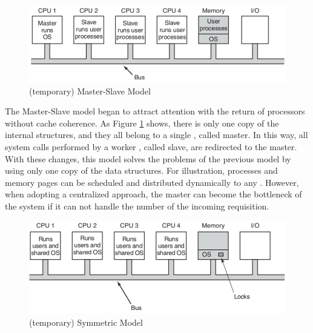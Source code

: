 			\begin{figure}[h]
				\centering
				\includegraphics[width=.8\textwidth]{images/master-slave-os.png}

				\caption{
					(temporary) Master-Slave \os Model
				}\par
				\label{fig::master_slave_os}
			\end{figure}

			The Master-Slave model began to attract attention with the return of
			processors without cache coherence.
			As Figure \ref{fig::master_slave_os} shows, there is only one copy of
			the internal \os structures, and they all belong to a single \cpu, called master.
			In this way, all system calls performed by a worker \cpu, called slave,
			are redirected to the master.
			With these changes, this model solves the problems of the previous model
			by using only one copy of the data structures.
			For illustration, processes and memory pages can be scheduled and
			distributed dynamically to any \cpus.
			However, when adopting a centralized approach, the master can become
			the bottleneck of the system if it can not handle the number of the
			incoming requisition.

			\begin{figure}[h]
				\centering
				\includegraphics[width=.8\textwidth]{images/smp-os.png}

				\caption{
					(temporary) Symmetric \os Model
				}\par
				\label{fig::smp_os}
			\end{figure}


